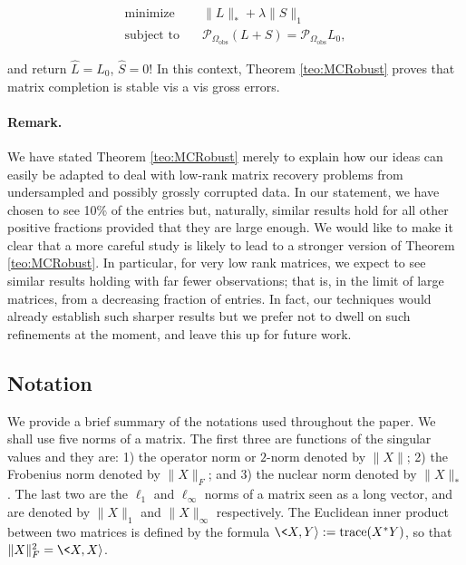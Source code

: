 \begin{equation}

   \begin{array}{ll}
     \text{minimize}   & \quad \|L\|_* + \lambda \|S\|_1\\
     \text{subject to} & \quad \mathcal{P}_{\Omega_{\text{obs}}}(L + S) = \mathcal{P}_{\Omega_{\text{obs}}} L_0,  
  \end{array}
\end{equation}

and return $\hat L = L_0$, $\hat S = 0$! In this context, Theorem
\ref{teo:MCRobust} proves that matrix completion is stable vis a vis gross errors.

\paragraph{Remark.} We have stated Theorem \ref{teo:MCRobust} merely to explain how our ideas can easily be adapted to deal with low-rank matrix recovery problems from undersampled and possibly grossly corrupted data. In our statement, we have chosen to see 10\% of the entries but, naturally, similar results hold for all other positive fractions provided that they are large enough.  We would like to make it clear that a more careful study is likely to lead to a stronger version of Theorem \ref{teo:MCRobust}. In particular, for very low rank matrices, we expect to see similar results holding with far fewer observations; that is, in the limit of large matrices, from a decreasing fraction of entries. In fact, our techniques would already establish such sharper results but we prefer not to dwell on such refinements at the moment, and leave this up for future work.

\subsection{Notation}
\label{sec:notation}

We provide a brief summary of the notations used throughout the paper. We shall use five norms of a matrix. The first three are functions of the singular values and they are: 1) the operator norm or $2$-norm denoted by $\|X\|$; 2) the Frobenius norm denoted by
$\|X\|_F$; and 3) the nuclear norm denoted by $\|X\|_*$. The last two are the $\ell_1$ and $\ell_\infty$ norms of a matrix seen as a long vector, and are denoted by $\|X\|_1$ and $\|X\|_\infty$ respectively. The Euclidean inner product between two matrices is defined by the formula $\<X, Y\rangle := \operatorname{trace}({X}^* {Y})$, so that $\|X\|_F^2 =
\<X,X\rangle$.

